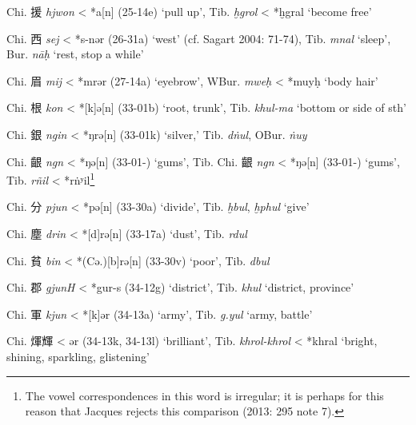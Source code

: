 \begin{description}
\item
Chi. 援 \emph{hjwon} \textless{} *{}a[n] (25-14e) `pull up',
Tib. {} \emph{ḫgrol} \textless{} *ḫg{}ral `become free'

\item
Chi. 西 \emph{sej} \textless{} *s-n{}ər (26-31a) `west' (cf. Sagart 2004:
71-74), Tib. {} \emph{mnal} `sleep', Bur. {} \emph{nāḥ} `rest, stop a
while'

\item
Chi. 眉 \emph{mij} \textless{} *mrər (27-14a) `eyebrow', WBur. {} \emph{mweḥ} \textless{} *muyḥ `body hair'

\item
Chi. 根 \emph{kon} \textless{} *[k]{}ə[n] (33-01b) `root, trunk',
Tib. {} \emph{khul-ma} `bottom or side of sth'

\item
Chi. 銀 \emph{ngin} \textless{} *ŋrə[n] (33-01k) `silver,' Tib. {} \emph{dṅul}, OBur. {} \emph{ṅuy}

\item
Chi. 齦 \emph{ng{}n} \textless{} *ŋə[n] (33-01-) `gums', Tib.
\protect\hypertarget{anchor-61}{}{}Chi. 齦  \emph{ng{}n} \textless{}
*ŋə[n] (33-01-) `gums', Tib. {} \emph{rñil} \textless{}
*rṅʸil\footnote{The vowel correspondences in this word is irregular; it
  is perhaps for this reason that Jacques rejects this comparison (2013:
  295 note 7).}

\item
Chi. 分 \emph{pjun} \textless{} *pə[n] (33-30a) `divide', Tib. {} \emph{ḫbul}, 
{} \emph{ḫphul} `give'

\item
Chi. 塵 \emph{drin} \textless{} *[d]rə[n] (33-17a) `dust', Tib. {} \emph{rdul}

\item
Chi. 貧 \emph{bin} \textless{} *(Cə.){[}b]rə[n] (33-30v) `poor',
Tib. {} \emph{dbul}

\item
Chi. 郡 \emph{gjunH} \textless{} *gur-s (34-12g) `district', Tib. {} \emph{khul} `district, province'

\item
Chi. 軍 \emph{kjun} \textless{} *[k]{}ər (34-13a) `army', Tib. {} \emph{g.yul} `army, battle'

\item
Chi. 煇輝 \emph{{}} \textless{} {}ər (34-13k, 34-13l) `brilliant',
Tib. {} \emph{khrol-khrol} \textless{} *kh{}ral `bright, shining,
sparkling, glistening'
\end{description}

